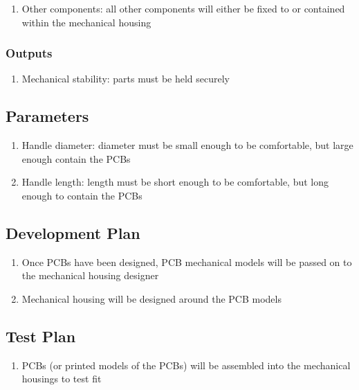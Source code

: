 \documentclass{notes}
\begin{document}
\begin{enumerate}
    \item Other components: all other components will either be fixed to or contained within the mechanical housing
\end{enumerate}

\subsubsection{Outputs}

\begin{enumerate}
    \item Mechanical stability: parts must be held securely
\end{enumerate}

\subsection{Parameters}

\begin{enumerate}
    \item Handle diameter: diameter must be small enough to be comfortable, but large enough contain the PCBs
    \item Handle length: length must be short enough to be comfortable, but long enough to contain the PCBs
\end{enumerate}

\subsection{Development Plan}

\begin{enumerate}
    \item Once PCBs have been designed, PCB mechanical models will be passed on to the mechanical housing designer
    \item Mechanical housing will be designed around the PCB models
\end{enumerate}

\subsection{Test Plan}

\begin{enumerate}
    \item PCBs (or printed models of the PCBs) will be assembled into the mechanical housings to test fit
\end{enumerate}
\end{document}
